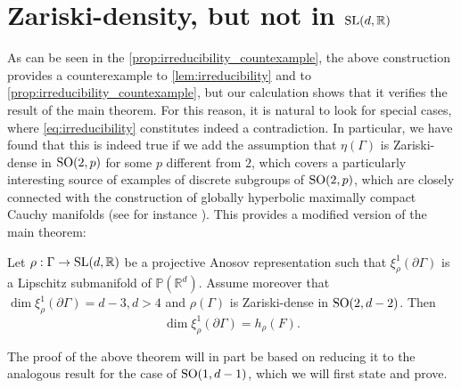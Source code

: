 \documentclass{report}
\begin{document}
\section{Zariski-density, but not in $\operatorname{{\mathrm{SL}}}(d,\mathbb R)$}
As can be seen in the \cref{prop:irreducibility_countexample}, the above construction provides a counterexample to \cref{lem:irreducibility} and to \cref{prop:irreducibility_countexample}, but our calculation shows that it verifies the result of the main theorem.
For this reason, it is natural to look for special cases, where \cref{eq:irreducibility} constitutes indeed a contradiction.
In particular, we have found that this is indeed true if we add the assumption that $\eta(\Gamma)$ is Zariski-dense in $\operatorname{{\mathrm{SO}}}(2,p)$ for some $p$ different from $2$, which covers a particularly interesting source of examples of discrete subgroups of $\operatorname{{\mathrm{SO}}}(2,p)$, which are closely connected with the construction of globally hyperbolic maximally compact Cauchy manifolds (see for instance \cite{monclair2023gromov}).
This provides a modified version of the main theorem:
\begin{theorem}\label{thm:main_anti_de_sitter}
    Let $\rho: \Gamma \to \operatorname{{\mathrm{SL}}}(d, \mathbb R)$ be a projective Anosov representation such that $\xi^1_\rho(\partial \Gamma)$ is a Lipschitz submanifold of $\mathbb P(\mathbb R^d)$.
    Assume moreover that $\dim \xi_\rho^1(\partial \Gamma) = d-3, d > 4$ and $\rho(\Gamma)$ is Zariski-dense in $\operatorname{{\mathrm{SO}}}(2,d-2)$.
    Then
    \[
        \dim \xi_\rho^1(\partial \Gamma) = h_\rho(F).
    \]
\end{theorem}
The proof of the above theorem will in part be based on reducing it to the analogous result for the case of $\operatorname{{\mathrm{SO}}}(1, d-1)$, which we will first state and prove.
\end{document}
